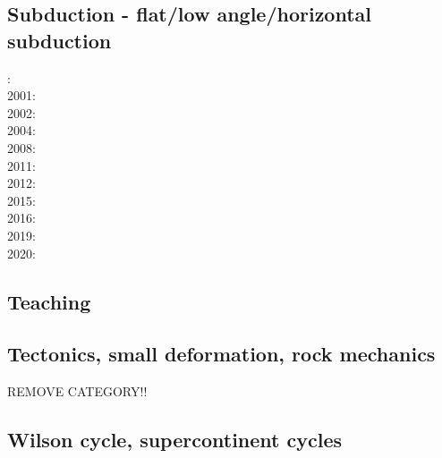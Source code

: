 \subsection{Subduction - flat/low angle/horizontal subduction}

{\scriptsize
{}: \cite{vavv00}\\
2001: \cite{vavv01}\\
2002: \cite{vavv02}\cite{vavv02b}\\
2004: \cite{vavv04d}\\
2008: \cite{pekh08}\cite{esfm08}\\
2011: \cite{cube11}\\
2012: \cite{mapm12}\cite{ronb12}\\
2015: \cite{gehm15}\cite{tarn15}\cite{ealw15}\\
2016: \cite{chdf16}\cite{huwc16}\cite{hulh16}\\
2019: \cite{sifg19}\cite{sams19b}\cite{malg19}\\
2020: \cite{dawl20}
}
\subsection{Teaching} 

{\scriptsize
\cite{grap11}
\cite{kerh14}
\cite{bemg19}
}
\subsection{Tectonics, small deformation, rock mechanics}
REMOVE CATEGORY!!
{\scriptsize
\noindent
\cite{ilma93}
\cite{hept96}
}

\subsection{Wilson cycle, supercontinent cycles}

